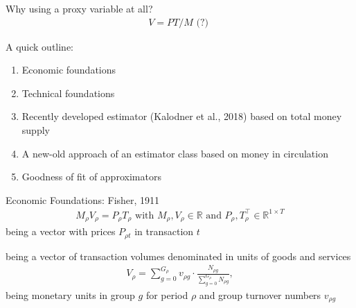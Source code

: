 \documentclass[]{beamer}
\begin{document}



\begin{frame}{Why using a proxy variable at all?}
  \begin{align*}
    V=PT/M \text{   (?)   }
  \end{align*}

\end{frame}




\begin{frame}{A quick outline:}
  \begin{enumerate}
  \item Economic foundations
  \item Technical foundations
  \item Recently developed estimator (Kalodner et al., 2018) based on total money supply
  \item A new-old approach of an estimator class based on money in circulation
  \item Goodness of fit of approximators
  \end{enumerate}
\end{frame}



\begin{frame}{Economic Foundations: Fisher, 1911}
  \begin{align*}%
    M_{\rho}V_{\rho}=P_{\rho}T_{\rho} \text{ with } M_{\rho}, V_{\rho} \in \mathbb{R} \text{ and } P_{\rho},T_{\rho}^{\top} \in \mathbb{R}^{1 \times T}
  \end{align*} %
  \vfill
   being a vector with prices \(P_{\rho t}\) in transaction \(t\)
  
   being a vector of transaction volumes denominated in units of goods and services
  \vfill
  \begin{align*}\label{eq:velo_concept}
    V_{\rho} = \sum_{g=0}^{G_{\rho}} v_{\rho g} \cdot \frac{N_{\rho g}}{\sum_{g=0}^{G_{\rho}} N_{\rho g}},
  \end{align*}
   being  monetary units in group \(g\) for period \(\rho\) and group turnover numbers \(v_{\rho g}\)%
  \vfill  
\end{frame}
\end{document}

